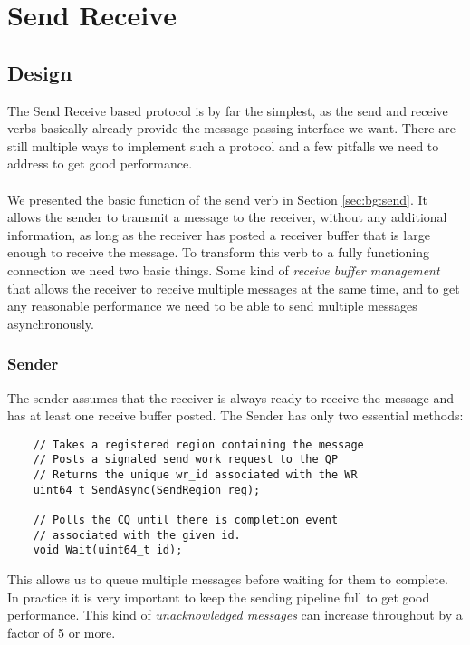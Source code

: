 \section{Send Receive} \label{sec:conn:send}\label{sendrcv}
\subsection{Design} \label{sendrcv-design}
The Send Receive based protocol is by far the simplest, as the send and receive verbs basically already provide the 
message passing interface we want. There are still multiple ways to implement such a protocol and a few pitfalls 
we need to address to get good performance.

\paragraph{} We presented the basic function of the send verb in Section \ref{sec:bg:send}. It allows the sender to transmit 
a message to the receiver, without any additional information, as long as the receiver has posted a receiver buffer that is 
large enough to receive the message. To transform this verb to a fully functioning connection we need two basic things. 
Some kind of \emph{receive buffer management} that allows the receiver to receive multiple messages at the same time, 
and to get any reasonable performance we need to be able to send multiple messages asynchronously.

\subsubsection{Sender} 
The sender assumes that the receiver is always ready to receive the message and has at least one receive buffer posted.
The Sender has only two essential methods:

\begin{lstlisting}  
    // Takes a registered region containing the message
    // Posts a signaled send work request to the QP
    // Returns the unique wr_id associated with the WR 
    uint64_t SendAsync(SendRegion reg);

    // Polls the CQ until there is completion event 
    // associated with the given id.
    void Wait(uint64_t id);

\end{lstlisting}

This allows us to queue multiple messages before waiting for them to complete. In practice it is very important to keep the
sending pipeline full to get good performance. This kind of \emph{unacknowledged messages} can increase throughout by a factor
of 5 or more.

